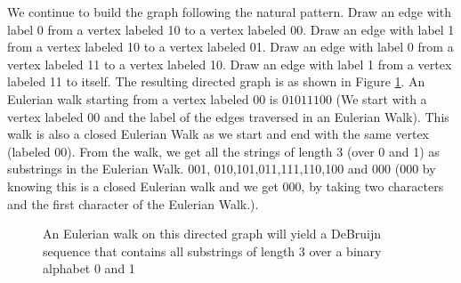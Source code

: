 We continue to build the graph following the natural pattern. Draw an edge with label 0 from a  vertex labeled 10 to a vertex labeled 00. Draw an edge with label 1 from a vertex labeled 10 to a vertex labeled 01.
Draw an edge with label 0 from a vertex labeled 11 to a vertex labeled 10. Draw an edge with label 1 from a vertex labeled 11 to itself.
The resulting directed graph is as shown in Figure \ref{4g6}. An Eulerian walk starting from a vertex labeled 00 is $0 1 0 1 1 1 0 0$  (We start with a vertex labeled 00 and the label of the edges traversed in an Eulerian Walk). This walk is also a closed Eulerian Walk as we start and end with the same vertex (labeled $00$).
From the walk, we get all the strings of length 3 (over 0 and 1) as substrings in the Eulerian Walk.
001, 010,101,011,111,110,100 and 000 (000 by knowing this is a closed Eulerian walk and we get 000, by taking two characters and the first character of the Eulerian Walk.).\\
\vspace{0.2in}
\begin{figure}
\begin{center}
\caption{ An Eulerian walk on this directed graph will yield a DeBruijn sequence that contains all substrings of length 3 over a binary alphabet 0 and 1}\label{4g6}
\end{center}
\end{figure}

